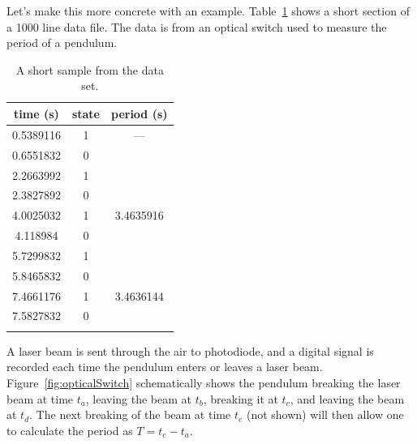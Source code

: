 Let's make this more concrete with an example. Table~\ref{tab:data} shows a short section of a 1000 line data file. The data is from an optical switch used to measure the period of a pendulum. 

\begin{table}
\caption{A short sample from the data set.}\label{tab:data}
\vspace*{3mm}
\begin{tabular}{ccc}
\toprule
time (s)			& state	& period (s)\\
\midrule
0.5389116	& \hspace*{5mm}1	\hspace*{5mm} & ---\\
0.6551832	&	\hspace*{5mm}0	\hspace*{5mm} &\\
2.2663992	&	\hspace*{5mm}1	\hspace*{5mm} &\\
2.3827892	&	\hspace*{5mm}0	 \hspace*{5mm}&\\
4.0025032	&	\hspace*{5mm}1	 \hspace*{5mm}&	3.4635916\\
4.118984	&	\hspace*{5mm}0	\hspace*{5mm} & \\
5.7299832	&\hspace*{5mm}1	\hspace*{5mm} &	 \\
5.8465832	&\hspace*{5mm}0 \hspace*{5mm} &	 \\
7.4661176	&\hspace*{5mm}1	 \hspace*{5mm}& 3.4636144\\
7.5827832	&\hspace*{5mm}0	\hspace*{5mm} & \\
\bottomrule
\vspace*{4mm}
\end{tabular}
\end{table}
A laser beam is sent through the air to photodiode, and a digital signal is recorded each time the pendulum enters or leaves a laser beam. Figure~\ref{fig:opticalSwitch} schematically shows the pendulum breaking the laser beam at time $t_a$, leaving the beam at $t_b$, breaking it at $t_c$, and leaving the beam at $t_d$. The next breaking of the beam at time $t_e$ (not shown) will then allow one to calculate the period as $T = t_e - t_a$. 

